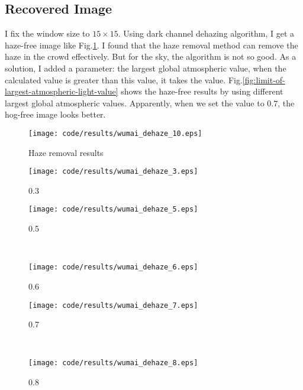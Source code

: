 \documentclass[journal,comsoc]{IEEEtran}
\begin{document}
\subsection{Recovered Image}
\label{subsec:recovered-image}

I fix the window size to $15\times15$. Using dark channel dehazing algorithm, I get a
haze-free image like Fig.\ref{fig:haze-removal-results}. I found that the haze removal
method can remove the haze in the crowd effectively. But for the sky, the algorithm is not
so good. As a solution, I added a parameter: the largest global atmospheric value, when the
calculated value is greater than this value, it takes the value. Fig.\ref{fig:limit-of-largest-atmospheric-light-value}
shows the haze-free results by using different largest global atmospheric values. Apparently,
when we set the value to $0.7$, the hog-free image looks better.
\begin{figure}[!htb]
  \centering
  \texttt{[image: code/results/wumai\_dehaze\_10.eps]}
  \caption{Haze removal results}
  \label{fig:haze-removal-results}    
\end{figure}


\begin{figure*}[t]
  \centering
  \begin{subfigure}{.5\textwidth}
    \centering
    \texttt{[image: code/results/wumai\_dehaze\_3.eps]}
    \caption{0.3}
    \label{subfig:atmospheric-light-0.3}
  \end{subfigure}%
  \begin{subfigure}{.5\textwidth}
    \centering
    \texttt{[image: code/results/wumai\_dehaze\_5.eps]}
    \caption{0.5}
    \label{subfig:atmospheric-light-0.5}
  \end{subfigure}\\
  \begin{subfigure}{0.5\textwidth}
    \centering
    \texttt{[image: code/results/wumai\_dehaze\_6.eps]}
    \caption{0.6}
    \label{subfig:atmospheric-light-0.6}
  \end{subfigure}%
  \begin{subfigure}{0.5\textwidth}
    \centering
    \texttt{[image: code/results/wumai\_dehaze\_7.eps]}
    \caption{0.7}
    \label{subfig:atmospheric-light-0.7}
  \end{subfigure}\\

  \begin{subfigure}{0.5\textwidth}
    \centering
    \texttt{[image: code/results/wumai\_dehaze\_8.eps]}
    \caption{0.8}
    \label{subfig:atmospheric-light-0.8}
  \end{subfigure}
  \caption{Limit of largest atmospheric light value}
  \label{fig:limit-of-largest-atmospheric-light-value}
\end{figure*}
\end{document}
